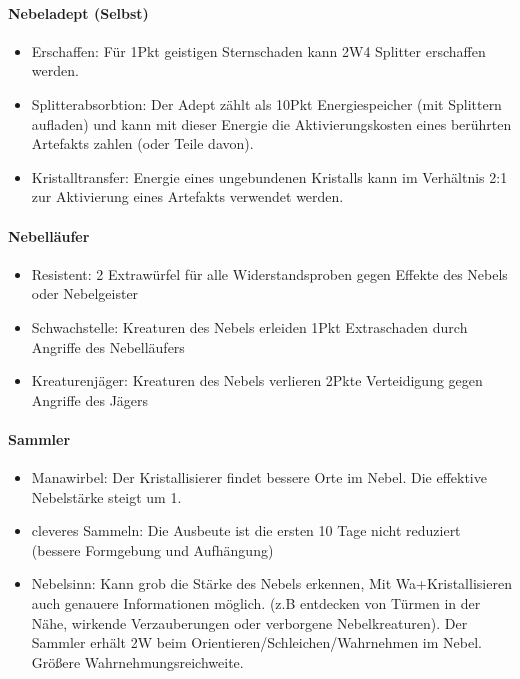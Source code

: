\documentclass{article}
\begin{document}
\paragraph{Nebeladept (Selbst)}

\begin{itemize}
\item Erschaffen: Für 1Pkt geistigen Sternschaden kann 2W4 Splitter erschaffen werden.
\item Splitterabsorbtion: Der Adept zählt als 10Pkt Energiespeicher (mit Splittern aufladen) und kann mit dieser Energie die Aktivierungskosten eines berührten Artefakts zahlen (oder Teile davon).
\item Kristalltransfer: Energie eines ungebundenen Kristalls kann im Verhältnis 2:1 zur Aktivierung eines Artefakts verwendet werden.
\end{itemize}

\paragraph{Nebelläufer}

\begin{itemize}
\item Resistent: 2 Extrawürfel für alle Widerstandsproben gegen Effekte des Nebels oder Nebelgeister
\item Schwachstelle: Kreaturen des Nebels erleiden 1Pkt Extraschaden durch Angriffe des Nebelläufers
\item Kreaturenjäger: Kreaturen des Nebels verlieren 2Pkte Verteidigung gegen Angriffe des Jägers
\end{itemize}

\paragraph{Sammler}

\begin{itemize}
\item Manawirbel: Der Kristallisierer findet bessere Orte im Nebel. Die effektive Nebelstärke steigt um 1.
\item cleveres Sammeln: Die Ausbeute ist die ersten 10 Tage nicht reduziert (bessere Formgebung und Aufhängung)
\item Nebelsinn: Kann grob die Stärke des Nebels erkennen, Mit Wa+Kristallisieren auch genauere Informationen möglich. (z.B entdecken von Türmen in der Nähe, wirkende Verzauberungen oder verborgene Nebelkreaturen). Der Sammler erhält 2W beim Orientieren/Schleichen/Wahrnehmen im Nebel. Größere Wahrnehmungsreichweite.
\end{itemize}
\end{document}
